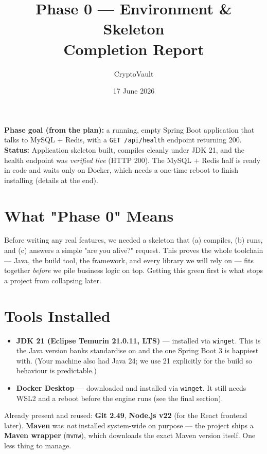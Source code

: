 \documentclass[11pt,a4paper]{article}
\title{\vspace{-1cm}\textbf{Phase 0 — Environment \& Skeleton}\\[3pt]
\large Completion Report}
\author{CryptoVault}
\date{17 June 2026}
\newcommand{\code}[1]{\texttt{#1}}
\begin{document}
\maketitle
\thispagestyle{fancy}

\begin{note}
\textbf{Phase goal (from the plan):} a running, empty Spring Boot application that talks to
MySQL + Redis, with a \code{GET /api/health} endpoint returning 200.\\[4pt]
\textbf{Status:} Application skeleton built, compiles cleanly under JDK 21, and the health
endpoint was \emph{verified live} (HTTP 200). The MySQL + Redis half is ready in code and waits
only on Docker, which needs a one-time reboot to finish installing (details at the end).
\end{note}

\section{What "Phase 0" Means}
Before writing any real features, we needed a skeleton that (a) compiles, (b) runs, and
(c) answers a simple "are you alive?" request. This proves the whole toolchain — Java, the build
tool, the framework, and every library we will rely on — fits together \emph{before} we pile
business logic on top. Getting this green first is what stops a project from collapsing later.

\section{Tools Installed}
\begin{itemize}[leftmargin=*]
  \item \textbf{JDK 21 (Eclipse Temurin 21.0.11, LTS)} — installed via \code{winget}. This is the
        Java version banks standardise on and the one Spring Boot 3 is happiest with. (Your machine
        also had Java 24; we use 21 explicitly for the build so behaviour is predictable.)
  \item \textbf{Docker Desktop} — downloaded and installed via \code{winget}. It still needs WSL2
        and a reboot before the engine runs (see the final section).
\end{itemize}
Already present and reused: \textbf{Git 2.49}, \textbf{Node.js v22} (for the React frontend later).
\textbf{Maven} was \emph{not} installed system-wide on purpose --- the project ships a
\textbf{Maven wrapper} (\code{mvnw}), which downloads the exact Maven version itself. One less thing
to manage.
\end{document}
